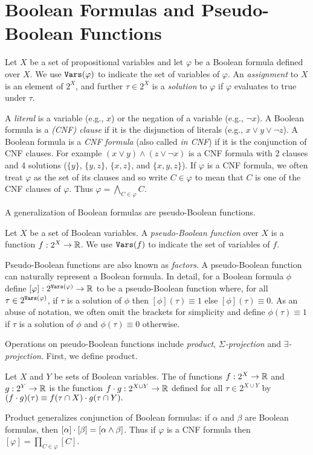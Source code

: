 \section{Boolean Formulas and Pseudo-Boolean Functions}
Let $X$ be a set of propositional variables and let $\varphi$ be a Boolean formula defined over $X$.
We use $\texttt{\upshape Vars}(\varphi)$ to indicate the set of variables of $\varphi$. An \emph{assignment} to $X$ is an element of $2^X$, and further $\tau \in 2^X$ is a \emph{solution} to $\varphi$ if $\varphi$ evaluates to true under $\tau$.

A \emph{literal} is a variable (e.g., $x$) or the negation of a variable (e.g., $\neg x$).
A Boolean formula is a \emph{(CNF) clause} if it is the disjunction of literals (e.g., $x \lor y \lor \neg z$).
A Boolean formula is a \emph{CNF formula} (also called \emph{in CNF}) if it is the conjunction of CNF clauses.
For example $(x \lor y) \land (z \lor \neg x)$ is a CNF formula with 2 clauses and 4 solutions ($\{y\}$, $\{y, z\}$, $\{x, z\}$, and $\{x, y, z\}$).
If $\varphi$ is a CNF formula, we often treat $\varphi$ as the set of its clauses and so write $C \in \varphi$ to mean that $C$ is one of the CNF clauses of $\varphi$. Thus $\varphi = \bigwedge_{C \in \varphi} C$.

A generalization of Boolean formulas are pseudo-Boolean functions.
\begin{definition}
\label{def_pseudoboolean}
Let $X$ be a set of Boolean variables.
A \emph{pseudo-Boolean function} over $X$ is a function $f: 2^X \to \mathbb{R}$.
We use $\texttt{\upshape Vars}(f)$ to indicate the set of variables of $f$.
\end{definition}
Pseudo-Boolean functions are also known as \emph{factors}.
A pseudo-Boolean function can naturally represent a Boolean formula. In detail, for a Boolean formula $\phi$ define $[\varphi]: 2^{\texttt{\upshape Vars}(\varphi)} \rightarrow \mathbb{R}$ to be a pseudo-Boolean function where, for all $\tau \in 2^{\texttt{\upshape Vars}(\varphi)}$, if $\tau$ is a solution of $\phi$ then $[\phi](\tau) \equiv 1$ else $[\phi](\tau) \equiv 0$.
As an abuse of notation, we often omit the brackets for simplicity and define $\phi(\tau) \equiv 1$ if $\tau$ is a solution of $\phi$ and $\phi(\tau) \equiv 0$ otherwise.

Operations on pseudo-Boolean functions include \emph{product}, \emph{$\Sigma$-projection} and \emph{$\exists$-projection}.
First, we define product.
\begin{definition}[Product]
\label{def_mult}
    Let $X$ and $Y$ be sets of Boolean variables.
    The  of functions $f: 2^X \to \mathbb{R}$ and $g: 2^Y \to \mathbb{R}$ is the function $f \cdot g: 2^{X \cup Y} \to \mathbb{R}$ defined for all $\tau \in 2^{X \cup Y}$ by
    $(f \cdot g)(\tau) \equiv f(\tau \cap X) \cdot g(\tau \cap Y).$
\end{definition}
Product generalizes conjunction of Boolean formulas: if $\alpha$ and $\beta$ are Boolean formulas, then $[\alpha] \cdot [\beta] = [\alpha \land \beta]$. Thus if $\varphi$ is a CNF formula then $[\varphi] = \prod_{C \in \varphi} [C]$.

